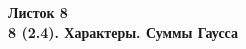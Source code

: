 \documentclass[a4paper, 11pt]{article}
\begin{document}
\begin{center} \Large \bf Листок 8\\ 8 (2.4). Характеры. Суммы Гаусса \end{center}


\end{document}
